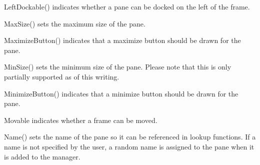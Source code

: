 
LeftDockable() indicates whether a pane can be docked on the left of the frame.

\label{wxauipaneinfomaxsize}


MaxSize() sets the maximum size of the pane.

\label{wxauipaneinfomaximizebutton}


MaximizeButton() indicates that a maximize button should be drawn for the pane.

\label{wxauipaneinfominsize}


MinSize() sets the minimum size of the pane.  Please note that this is only partially supported as of this writing.

\label{wxauipaneinfominimizebutton}


MinimizeButton() indicates that a minimize button should be drawn for the pane.

\label{wxauipaneinfomovable}


Movable indicates whether a frame can be moved.

\label{wxauipaneinfoname}


Name() sets the name of the pane so it can be referenced in lookup functions.  If a name is not specified by the user, a random name is assigned to the pane when it is added to the manager.

\label{wxauipaneinfopaneborder}


